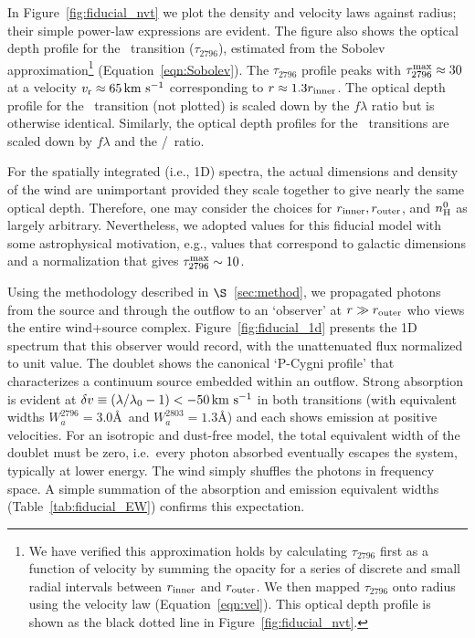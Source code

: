 \documentclass[12pt,preprint]{aastex}
\begin{document}
In Figure~\ref{fig:fiducial_nvt} we plot the density and velocity
laws against radius;  
their simple power-law expressions are evident.  The figure also
shows the optical depth profile for the \mgiia\ transition
($\tau_{2796}$), estimated from the Sobolev approximation\footnote{We
  have verified this approximation holds by calculating 
  $\tau_{2796}$ first
  as a function of velocity by summing the opacity for a series of
  discrete and small radial intervals
  between $r_{\rm inner}$  and $r_{\rm outer}$.   We then mapped
  $\tau_{2796}$ onto radius using the velocity law
  (Equation~\ref{eqn:vel}). This optical depth profile is shown as the
black dotted line in Figure~\ref{fig:fiducial_nvt}.}
(Equation~\ref{eqn:Sobolev}). 
The $\tau_{2796}$ profile peaks with $\tau_{2796}^{\rm max} \approx 30$
at a velocity $v_{\rm r} \approx 65 \, {\rm km~s^{-1}}$ corresponding to $r \approx 1.3
r_{\rm inner}$.  The optical depth profile for the \mgiib\ transition
(not plotted) is scaled down by the $f\lambda$ ratio but is otherwise identical.  Similarly,
the optical depth profiles for the \feiid\ transitions are
scaled down by $f \lambda$ and the \nfe/\nmg\ ratio.  

For the spatially integrated (i.e., 1D) spectra, the actual dimensions and density of the wind are
unimportant provided they scale together to give nearly the same
optical depth. Therefore, one may consider the choices for
$r_{\rm inner}, r_{\rm outer}$, and $n_{\rm H}^0$ as largely arbitrary.
Nevertheless, we adopted values for this fiducial model with
some astrophysical motivation,  e.g., values that correspond to
galactic dimensions and a normalization that gives $\tau_{2796}^{\rm
  max} \sim 10$.


Using the methodology described in $\S$~\ref{sec:method}, we
propagated photons from the source and through the outflow to an
`observer' at $r \gg r_{\rm outer}$ who views the entire wind+source
complex.  Figure~\ref{fig:fiducial_1d} presents the 1D spectrum
that this observer would record, with the unattenuated flux
normalized to unit value.   The  doublet
shows the canonical `P-Cygni profile' that characterizes a continuum
source embedded within an outflow.  Strong absorption is evident at
$\delta v  \equiv (\lambda/\lambda_0 - 1) < -50 \, {\rm km~s^{-1}}$ in both
transitions (with equivalent widths $W^{2796}_a =
3.0$\AA\ and $W^{2803}_a = 1.3$\AA) and each shows emission at
positive velocities.  For an isotropic and dust-free model, the
total equivalent width of the doublet must be zero,
i.e.\ every photon
absorbed eventually escapes the system, typically at lower
energy.  The wind simply shuffles the photons in frequency space.
A simple summation of the absorption and emission equivalent widths
(Table~\ref{tab:fiducial_EW}) confirms this expectation.
\end{document}
